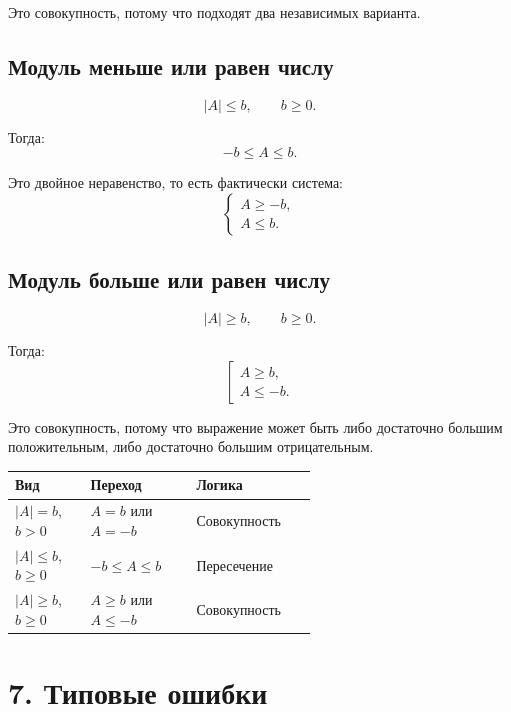 \documentclass[a4paper,12pt]{article}
\begin{document}
Это совокупность, потому что подходят два независимых варианта.

\subsection*{Модуль меньше или равен числу}

\[
|A|\le b,\qquad b\ge0.
\]

Тогда:
\[
-b\le A\le b.
\]

Это двойное неравенство, то есть фактически система:
\[
\begin{cases}
A\ge -b,\\
A\le b.
\end{cases}
\]

\subsection*{Модуль больше или равен числу}

\[
|A|\ge b,\qquad b\ge0.
\]

Тогда:
\[
\left[
\begin{array}{l}
A\ge b,\\
A\le -b.
\end{array}
\right.
\]

Это совокупность, потому что выражение может быть либо достаточно большим положительным, либо достаточно большим отрицательным.

\begin{center}
\renewcommand{\arraystretch}{1.35}
\begin{tabularx}{\linewidth}{p{0.25\linewidth}p{0.35\linewidth}X}
\toprule
Вид & Переход & Логика \\
\midrule
$|A|=b$, $b>0$ & $A=b$ или $A=-b$ & Совокупность \\
$|A|\le b$, $b\ge0$ & $-b\le A\le b$ & Пересечение \\
$|A|\ge b$, $b\ge0$ & $A\ge b$ или $A\le -b$ & Совокупность \\
\bottomrule
\end{tabularx}
\end{center}

\section*{7. Типовые ошибки}
\end{document}
